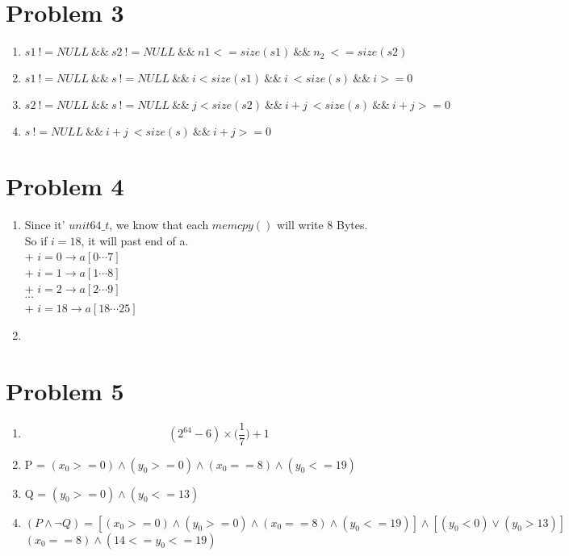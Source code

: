 \documentclass[11pt]{article}
\newenvironment{qparts}{\begin{enumerate}[{(}a{)}]}{\end{enumerate}}
\newcommand{\tab}{\hspace*{2em}}
\begin{document}
\section*{Problem 3}

\begin{qparts}
\item
$s1\ != NULL\ \&\&\ s2\ != NULL\ \&\&\ n1 <= size(s1)\ \&\&\ n_2\ <= size(s2)$

\item
$s1\ != NULL\ \&\&\ s\ != NULL\ \&\&\ i < size(s1)\ \&\&\ i\ < size(s)\ \&\&\ i>=0$

\item
$s2\ != NULL\ \&\&\ s\ != NULL\ \&\&\ j < size(s2)\ \&\&\ i+j\ < size(s)\ \&\&\ i+j>=0$

\item
$s\ != NULL\ \&\&\ i+j\ < size(s)\ \&\&\ i+j>=0$
\end{qparts}


\newpage
\section*{Problem 4}

\begin{qparts}
\item
Since it' $unit64\_t$, we know that each $memcpy()$ will write 8 Bytes.\\
So if $i= 18$, it will past end of a.\\
\tab + $i = 0 \rightarrow a[0\cdots 7]$\\
\tab + $i = 1 \rightarrow a[1\cdots 8]$\\
\tab + $i = 2 \rightarrow a[2\cdots 9]$\\
\tab\tab $\cdots$\\
\tab + $i = 18 \rightarrow a[18\cdots 25]$

\item
{}



\end{qparts}

\newpage
\section*{Problem 5}

\begin{qparts}
\item
$$\boxed{(2^{64}-6)\times\Big(\frac{1}{7}\Big) + 1}$$
\item
P = $(x_0 >= 0) \land (y_0 >= 0) \land (x_0 == 8) \land (y_0 <= 19)$
\item
Q = $(y_0 >= 0) \land (y_0 <= 13)$

\item
$(P \land \neg Q) = [(x_0 >= 0) \land (y_0 >= 0) \land (x_0 == 8) \land (y_0 <= 19)] \land [(y_0 < 0) \lor (y_0 > 13)]$\\
$\boxed{(x_0 == 8) \land (14<= y_0<=19)}$
\end{qparts}
\end{document}
